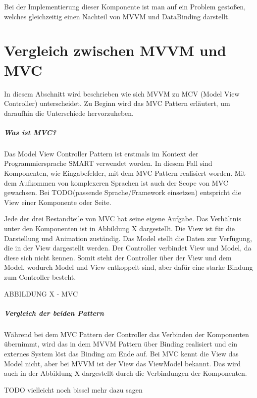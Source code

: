 \documentclass[titlepage=false,12pt]{scrreprt}
\begin{document}
\noindent
Bei der Implementierung dieser Komponente ist man auf ein Problem gestoßen, welches gleichzeitig einen Nachteil von MVVM und DataBinding darstellt.

\chapter{Vergleich zwischen MVVM und MVC}

In diesem Abschnitt wird beschrieben wie sich MVVM zu MCV (Model View Controller) unterscheidet. 
Zu Beginn wird das MVC Pattern erläutert, um daraufhin die Unterschiede hervorzuheben. 

\paragraph{Was ist MVC?}

Das Model View Controller Pattern ist erstmals im Kontext der Programmiersprache SMART verwendet 
worden. In diesem Fall sind Komponenten, wie Eingabefelder, mit dem MVC Pattern realisiert worden.
Mit dem Aufkommen von komplexeren Sprachen ist auch der Scope von MVC gewachsen. Bei TODO(passende Sprache/Framework einsetzen)
entspricht die View einer Komponente oder Seite.

Jede der drei Bestandteile von MVC hat seine eigene Aufgabe. Das Verhältnis unter den Komponenten
ist in Abbildung X dargestellt. Die View ist für die Darstellung und
Animation zuständig. Das Model stellt die Daten zur Verfügung, die in der View dargestellt werden.
Der Controller verbindet View und Model, da diese sich nicht kennen. Somit steht der Controller 
über der View und dem Model, wodurch Model und View entkoppelt sind, aber dafür eine starke Bindung
zum Controller besteht. 

ABBILDUNG X - MVC

\paragraph{Vergleich der beiden Pattern}

Während bei dem MVC Pattern der Controller das Verbinden der Komponenten übernimmt, wird das
in dem MVVM Pattern über Binding realisiert und ein externes System löst das Binding am Ende auf.
Bei MVC kennt die View das Model nicht, aber bei MVVM ist der View das ViewModel bekannt.
Das wird auch in der Abbildung X dargestellt durch die Verbindungen der Komponenten.

TODO vielleicht noch bissel mehr dazu sagen
\end{document}
